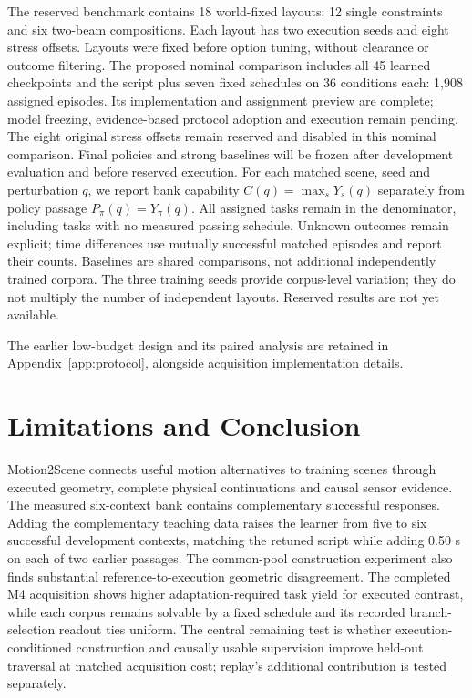 \documentclass[10pt]{article}
\begin{document}
The reserved benchmark contains 18 world-fixed layouts: 12 single constraints
and six two-beam compositions. Each layout has two execution seeds and eight
stress offsets. Layouts were fixed before option tuning, without clearance
or outcome filtering. The proposed nominal comparison includes all 45 learned
checkpoints and the script plus seven fixed schedules on 36 conditions each:
1,908 assigned episodes. Its implementation and assignment preview are complete;
model freezing, evidence-based protocol adoption and execution remain pending.
The eight original stress offsets remain reserved and disabled in this nominal
comparison. Final policies and strong baselines will be frozen after development
evaluation and before reserved execution. For each matched
scene, seed and perturbation $q$, we report bank capability
$C(q)=\max_s Y_s(q)$ separately from policy passage $P_\pi(q)=Y_\pi(q)$.
All assigned tasks remain in the denominator, including tasks with no measured
passing schedule. Unknown outcomes remain explicit; time differences use
mutually successful matched episodes and report their counts. Baselines are
shared comparisons, not additional independently trained corpora. The three
training seeds provide corpus-level variation; they do not multiply the number
of independent layouts. Reserved results are not yet available.

The earlier low-budget design and its paired analysis are retained in
Appendix~\ref{app:protocol}, alongside acquisition implementation details.

\section{Limitations and Conclusion}
Motion2Scene connects useful motion alternatives to training scenes through
executed geometry, complete physical continuations and causal sensor evidence.
The measured six-context bank contains complementary successful responses.
Adding the complementary teaching data raises the learner from five to six
successful development contexts, matching the retuned script while adding
0.50 s on each of two earlier passages. The common-pool construction experiment
also finds substantial reference-to-execution geometric disagreement. The
completed M4 acquisition shows higher adaptation-required task yield for
executed contrast, while each corpus remains solvable by a fixed schedule and
its recorded branch-selection readout ties uniform. The central remaining test
is whether execution-conditioned construction and
causally usable supervision improve held-out traversal at matched acquisition
cost; replay's additional contribution is tested separately.
\end{document}
